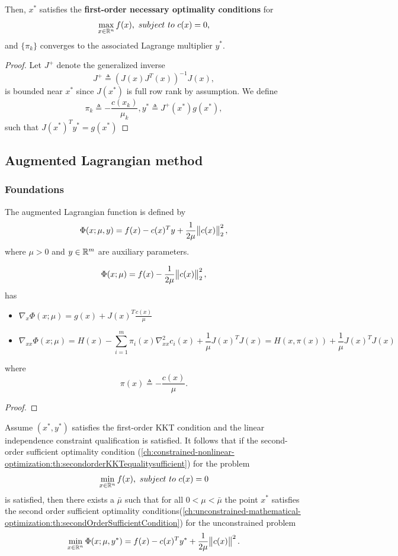 \begin{refsection}
\begin{lemma}
	Then, $x^*$ satisfies the \textbf{first-order necessary optimality conditions} for 
	$$\max_{x\in\mathbb{R}^n} f(x), ~subject~to~ c(x) = 0,$$
	and $\{\pi_k\}$ converges to the associated Lagrange multiplier $y^*$.
\end{lemma}
\begin{proof}
Let $J^+$ denote the generalized inverse
$$J^+ \triangleq (J(x)J^T(x))^{-1}J(x),$$
is bounded near $x^*$ since $J(x^*)$ is full row rank by assumption. We define 
$$\pi_k \triangleq -\frac{c(x_k)}{\mu_k}, y^* \triangleq J^+(x^*)g(x^*),$$
such that $J(x^*)^Ty^* = g(x^*)$	
\end{proof}

\subsection{Augmented Lagrangian method}
\subsubsection{Foundations}
\begin{definition}
The augmented Lagrangian function is defined by
$$\Phi(x;\mu,y) = f(x) - c(x)^Ty + \frac{1}{2\mu}\norm{c(x)}_2^2,$$
where $\mu > 0$ and $y\in \mathbb{R}^m$ are auxiliary parameters.
\end{definition}

\begin{lemma}
	$$\Phi(x;\mu) = f(x) -  \frac{1}{2\mu}\norm{c(x)}_2^2,$$
	has
	\begin{itemize}
		\item $\nabla_x \Phi(x;\mu) = g(x) + J(x)^T\frac{c(x)}{\mu}$
		\item $$\nabla_{xx} \Phi(x;\mu) = H(x) - \sum_{i=1}^m \pi_i(x)\nabla_{xx}^2 c_i(x) + \frac{1}{\mu}J(x)^TJ(x) = H(x,\pi(x)) + \frac{1}{\mu}J(x)^TJ(x)$$
	\end{itemize}
	where $$\pi(x) \triangleq -\frac{c(x)}{\mu}.$$
\end{lemma}
\begin{proof}
	
\end{proof}



\begin{theorem}\cite[517]{nocedal2006numerical}
Assume $(x^*,y^*)$ satisfies the first-order KKT condition and the linear independence constraint qualification is satisfied. It follows that if the second-order sufficient optimality condition (\autoref{ch:constrained-nonlinear-optimization:th:secondorderKKTequalitysufficient}) for the problem
	$$\min_{x\in\mathbb{R}^n} f(x), ~subject~to~c(x) = 0$$
is satisfied, then there exists a $\bar{\mu}$ such that for all $0<\mu <\bar{\mu}$ the point $x^*$ satisfies the second order sufficient optimality conditions(\autoref{ch:unconstrained-mathematical-optimization:th:secondOrderSufficientCondition})  for the unconstrained problem
$$\min_{x\in\mathbb{R}^n} \Phi(x;\mu,y^*) = f(x) -c(x)^Ty^* + \frac{1}{2\mu} \norm{c(x)}^2.$$


\end{theorem}
\end{refsection}
